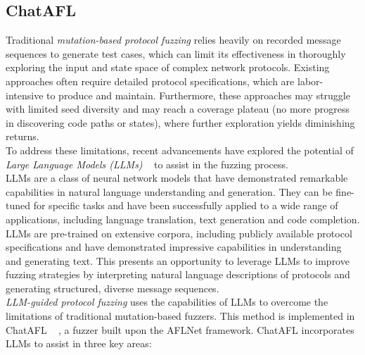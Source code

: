 \subsection{ChatAFL}
Traditional \textit{mutation-based protocol fuzzing} relies heavily on recorded message sequences to generate test cases, which can limit its effectiveness in thoroughly exploring the input and state space of complex network protocols. Existing approaches often require detailed protocol specifications, which are labor-intensive to produce and maintain. Furthermore, these approaches may struggle with limited seed diversity and may reach a coverage plateau (no more progress in discovering code paths or states), where further exploration yields diminishing returns.
\\To address these limitations, recent advancements have explored the potential of \textit{Large Language Models (LLMs)} ~\cite{minaee2024largelanguagemodelssurvey} to assist in the fuzzing process.
\\LLMs are a class of neural network models that have demonstrated remarkable capabilities in natural language understanding and generation. They can be fine-tuned for specific tasks and have been successfully applied to a wide range of applications, including language translation, text generation and code completion.
\\LLMs are pre-trained on extensive corpora, including publicly available protocol specifications and have demonstrated impressive capabilities in understanding and generating text. This presents an opportunity to leverage LLMs to improve fuzzing strategies by interpreting natural language descriptions of protocols and generating structured, diverse message sequences.
\\\textit{LLM-guided protocol fuzzing} uses the capabilities of LLMs to overcome the limitations of traditional mutation-based fuzzers. This method is implemented in ChatAFL ~\cite{chatafl} , a fuzzer built upon the AFLNet framework. ChatAFL incorporates LLMs to assist in three key areas:

